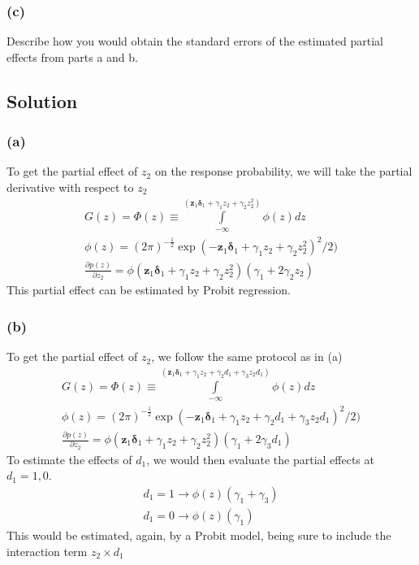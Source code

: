 \documentclass[10pt, a4paper]{article}
\begin{document}
      \subsubsection*{(c)}
        Describe how you would obtain the standard errors of the estimated partial effects from parts a and b.
    \subsection*{Solution}
      \subsubsection*{(a)}
        To get the partial effect of $z_2$ on the response probability, we will take the partial derivative with respect to $z_2$
        \begin{gather*}
          G(z) = \Phi(z) \equiv \int\limits_{-\infty}^{(\textbf{z}_1\boldsymbol{\delta}_1 + \gamma_1z_2 + \gamma_2z_2^2)}\phi(z)dz \\
          \phi(z) = (2\pi)^{-\frac{1}{2}}\exp(-\textbf{z}_1\boldsymbol{\delta}_1 + \gamma_1z_2 + \gamma_2z_2^2)^2/2) \\
          \frac{\partial p(z)}{\partial z_2} = \phi(\textbf{z}_1\boldsymbol{\delta}_1 + \gamma_1z_2 + \gamma_2z_2^2)(\gamma_1+2\gamma_2z_2)
        \end{gather*}
        This partial effect can be estimated by Probit regression.
      \subsubsection*{(b)}
        To get the partial effect of $z_2$, we follow the same protocol as in (a)
        \begin{gather*}
          G(z) = \Phi(z) \equiv \int\limits_{-\infty}^{(\textbf{z}_1\boldsymbol{\delta}_1 + \gamma_1z_2 + \gamma_2d_1 + \gamma_3z_2d_1)}\phi(z)dz \\
          \phi(z) = (2\pi)^{-\frac{1}{2}}\exp(-\textbf{z}_1\boldsymbol{\delta}_1 + \gamma_1z_2 + \gamma_2d_1 + \gamma_3z_2d_1)^2/2) \\
          \frac{\partial p(z)}{\partial z_2} = \phi(\textbf{z}_1\boldsymbol{\delta}_1 + \gamma_1z_2 + \gamma_2z_2^2)(\gamma_1+2\gamma_3d_1)
        \end{gather*}
        To estimate the effects of $d_1$, we would then evaluate the partial effects at $d_1 = 1, 0$.
        \begin{gather*}
          d_1 = 1 \rightarrow \phi(z)(\gamma_1 + \gamma_3) \\
          d_1 = 0 \rightarrow \phi(z)(\gamma_1)
        \end{gather*}
        This would be estimated, again, by a Probit model, being sure to include the interaction term $z_2\times d_1$
\end{document}
